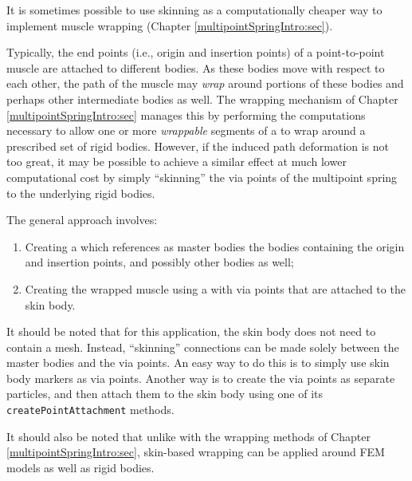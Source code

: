 It is sometimes possible to use skinning as a computationally cheaper
way to implement muscle wrapping (Chapter
\ref{multipointSpringIntro:sec}).

Typically, the end points (i.e., origin and insertion points) of a
point-to-point muscle are attached to different bodies. As these
bodies move with respect to each other, the path of the muscle may
{\it wrap} around portions of these bodies and perhaps other
intermediate bodies as well. The wrapping mechanism of Chapter
\ref{multipointSpringIntro:sec} manages this by performing the
computations necessary to allow one or more {\it wrappable} segments
of a  to wrap
around a prescribed set of rigid bodies. However, if the induced path
deformation is not too great, it may be possible to achieve a similar
effect at much lower computational cost by simply ``skinning'' the via
points of the multipoint spring to the underlying rigid bodies.

The general approach involves:

\begin{enumerate}

\item Creating a 
which references as master bodies the bodies containing the origin and
insertion points, and possibly other bodies as well;

\item Creating the wrapped muscle using a 
with via points that are attached to the skin body.
        
\end{enumerate}

It should be noted that for this application, the skin body does not
need to contain a mesh. Instead, ``skinning'' connections can be made
solely between the master bodies and the via points. An easy way to do
this is to simply use skin body markers as via points.  Another way is
to create the via points as separate particles, and then attach them
to the skin body using one of its {\tt createPointAttachment} methods.

\begin{sideblock}
It should also be noted that unlike with the wrapping methods of
Chapter \ref{multipointSpringIntro:sec}, skin-based wrapping can be
applied around FEM models as well as rigid bodies.
\end{sideblock}

